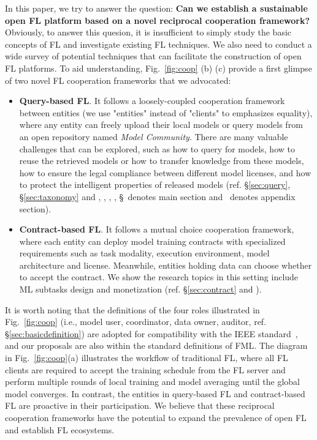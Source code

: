 In this paper, we try to answer the question: \textbf{Can we establish a sustainable open FL platform based on a novel reciprocal cooperation framework?}
Obviously, to answer this quesion, it is insufficient to simply study the basic concepts of FL and investigate existing FL techniques.
We also need to conduct a wide survey of potential techniques that can facilitate the construction of open FL platforms.
To aid understanding, Fig.~\ref{fig:coop} (b) (c) provide a first glimpse of two novel FL cooperation frameworks that we advocated: 
\begin{itemize}
    \item \textbf{Query-based FL}. It follows a loosely-coupled cooperation framework between entities (we use "entities" instead of "clients" to emphasizes equality), where any entity can freely upload their local models or query models from an open repository named \textit{Model Community}.
    There are many valuable challenges that can be explored, such as how to query for models, how to reuse the retrieved models or how to transfer knowledge from these models, how to ensure the legal compliance between different model licenses, and how to protect the intelligent properties of released models (ref. \S\ref{sec:query}, \S\ref{sec:taxonomy} and , , , , \S~denotes main section and \ddag~denotes appendix section). %
    \item \textbf{Contract-based FL}. It follows a mutual choice cooperation framework, where each entity can deploy model training contracts with specialized requirements such as task modality, execution environment, model architecture and license. Meanwhile, entities holding data can choose whether to accept the contract.
    We show the research topics in this setting include ML subtasks design and monetization (ref. \S\ref{sec:contract} and ).
\end{itemize}
It is worth noting that the definitions of the four roles illustrated in Fig.~\ref{fig:coop} (i.e., model user, coordinator, data owner, auditor, ref. \S\ref{sec:basicdefinition}) are adopted for compatibility with the IEEE standard~\cite{IEEEstd3652}, and our proposals are also within the standard definitions of FML.
The diagram in Fig.~\ref{fig:coop}(a) illustrates the workflow of traditional FL, where all FL clients are required to accept the training schedule from the FL server and perform multiple rounds of local training and model averaging until the global model converges.
In contrast, the entities in query-based FL and contract-based FL are proactive in their participation.
We believe that these reciprocal cooperation frameworks have the potential to expand the prevalence of open FL and establish FL ecosystems.


